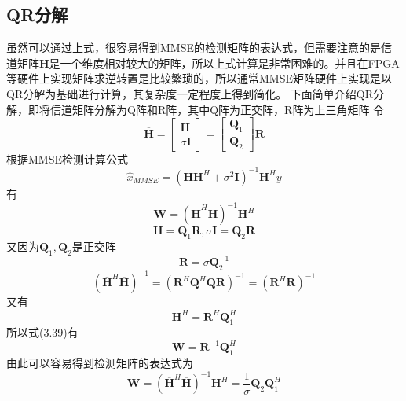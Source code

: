 \documentclass[bachelor,nocolorlinks, printoneside]{seuthesis} %
\begin{document}
\begin{Main}
\section{QR分解}
虽然可以通过上式，很容易得到MMSE的检测矩阵的表达式，但需要注意的是信道矩阵$\mathbf{H}$是一个维度相对较大的矩阵，所以上式计算是非常困难的。并且在FPGA等硬件上实现矩阵求逆转置是比较繁琐的，所以通常MMSE矩阵硬件上实现是以QR分解为基础进行计算，其复杂度一定程度上得到简化。
下面简单介绍QR分解，即将信道矩阵分解为Q阵和R阵，其中Q阵为正交阵，R阵为上三角矩阵
令
\begin{equation}\label{key}
\overline{\mathbf{H}} = \left[
\begin{array}{c}
\mathbf{H}\\
\sigma \mathbf{I}
\end{array} \right] =
\left[
\begin{array}{c}
\mathbf{Q}_1\\
\mathbf{Q}_2
\end{array} \right] \mathbf{R}
\end{equation}
根据MMSE检测计算公式
\begin{equation}\label{key}
\hat{x}_{MMSE} = (\mathbf{H}\mathbf{H}^H + \sigma^2 \mathbf{I})^{-1}\mathbf{H}^H y
\end{equation}
有
\begin{equation}\label{key}
\mathbf{W}=(\overline{\mathbf{H}}^H \overline{\mathbf{H}})^{-1} \mathbf{H}^H
\end{equation}
\begin{equation}\label{key}
\mathbf{H} = \mathbf{Q}_1 \mathbf{R} ,\sigma\mathbf{I} = \mathbf{Q}_2\mathbf{R}
\end{equation}
又因为$\mathbf{Q}_1,\mathbf{Q}_2$是正交阵
\begin{equation}\label{key}
\mathbf{R} = \sigma \mathbf{Q}_2^{-1}
\end{equation}
\begin{equation}\label{key}
(\overline{\mathbf{H}}^H \overline{\mathbf{H}})^{-1} = (\mathbf{R}^H \mathbf{Q}^H\mathbf{Q} \mathbf{R})^{-1} =(\mathbf{R}^H \mathbf{R})^{-1}
\end{equation}
又有
\begin{equation}\label{key}
\mathbf{H}^{H} =\mathbf{R}^{H} \mathbf{Q}_1^H 
\end{equation}
所以式(3.39)有
\begin{equation}\label{key}
\mathbf{W} = \mathbf{R}^{-1} \mathbf{Q}_1^H
\end{equation}
由此可以容易得到检测矩阵的表达式为
\begin{equation}\label{key}
\mathbf{W}=(\overline{\mathbf{H}}^H \overline{\mathbf{H}})^{-1} \mathbf{H}^H = \frac{1}{\sigma} \mathbf{Q}_2 \mathbf{Q}_1^H
\end{equation}


\end{Main}
\end{document}
